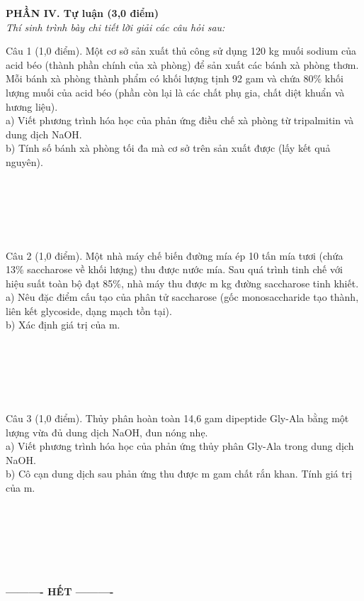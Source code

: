 \documentclass[11pt,a4paper]{article}
\begin{document}
\vspace{4pt}
\noindent\textbf{\large\color{mainGreen}PHẦN IV. Tự luận (3,0 điểm)}\\
\textit{Thí sinh trình bày chi tiết lời giải các câu hỏi sau:}
\vspace{4pt}

Câu 1 (1,0 điểm). Một cơ sở sản xuất thủ công sử dụng 120 kg muối sodium của acid béo (thành phần chính của xà phòng) để sản xuất các bánh xà phòng thơm. Mỗi bánh xà phòng thành phẩm có khối lượng tịnh 92 gam và chứa 80\% khối lượng muối của acid béo (phần còn lại là các chất phụ gia, chất diệt khuẩn và hương liệu).\\
a) Viết phương trình hóa học của phản ứng điều chế xà phòng từ tripalmitin và dung dịch NaOH.\\
b) Tính số bánh xà phòng tối đa mà cơ sở trên sản xuất được (lấy kết quả nguyên).\\[2pt]
\par\noindent\dotfill\\
\noindent\dotfill\\
\noindent\dotfill\\
\noindent\dotfill\\
\noindent\dotfill\\[4pt]
\vspace{2pt}
Câu 2 (1,0 điểm). Một nhà máy chế biến đường mía ép 10 tấn mía tươi (chứa 13\% saccharose về khối lượng) thu được nước mía. Sau quá trình tinh chế với hiệu suất toàn bộ đạt 85\%, nhà máy thu được m kg đường saccharose tinh khiết.\\
a) Nêu đặc điểm cấu tạo của phân tử saccharose (gốc monosaccharide tạo thành, liên kết glycoside, dạng mạch tồn tại).\\
b) Xác định giá trị của m.\\[2pt]
\par\noindent\dotfill\\
\noindent\dotfill\\
\noindent\dotfill\\
\noindent\dotfill\\
\noindent\dotfill\\[4pt]
\vspace{2pt}
Câu 3 (1,0 điểm). Thủy phân hoàn toàn 14,6 gam dipeptide Gly-Ala bằng một lượng vừa đủ dung dịch NaOH, đun nóng nhẹ.\\
a) Viết phương trình hóa học của phản ứng thủy phân Gly-Ala trong dung dịch NaOH.\\
b) Cô cạn dung dịch sau phản ứng thu được m gam chất rắn khan. Tính giá trị của m.\\[2pt]
\par\noindent\dotfill\\
\noindent\dotfill\\
\noindent\dotfill\\
\noindent\dotfill\\
\noindent\dotfill\\[4pt]
\vspace{2pt}

\begin{center}
\textbf{---------- HẾT ----------}
\end{center}
\end{document}
